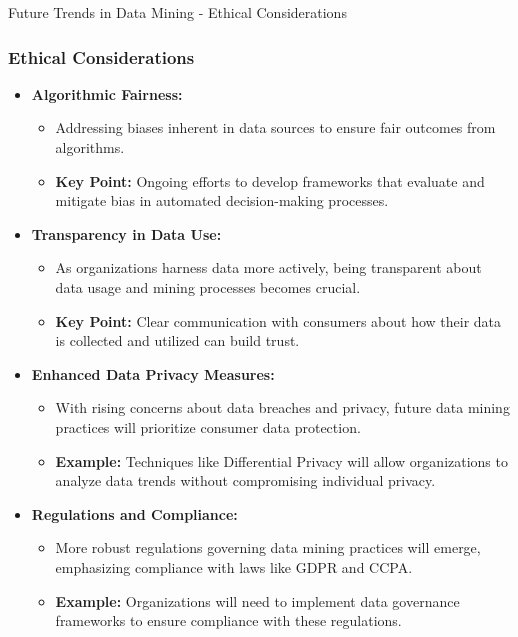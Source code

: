 \documentclass[aspectratio=169]{beamer}
\begin{document}
\begin{frame}[fragile]{Future Trends in Data Mining - Ethical Considerations}
    \frametitle{Ethical Considerations}
    \begin{itemize}
        \item \textbf{Algorithmic Fairness:}
            \begin{itemize}
                \item Addressing biases inherent in data sources to ensure fair outcomes from algorithms.
                \item \textbf{Key Point:} Ongoing efforts to develop frameworks that evaluate and mitigate bias in automated decision-making processes.
            \end{itemize}

        \item \textbf{Transparency in Data Use:}
            \begin{itemize}
                \item As organizations harness data more actively, being transparent about data usage and mining processes becomes crucial.
                \item \textbf{Key Point:} Clear communication with consumers about how their data is collected and utilized can build trust.
            \end{itemize}

        \item \textbf{Enhanced Data Privacy Measures:}
            \begin{itemize}
                \item With rising concerns about data breaches and privacy, future data mining practices will prioritize consumer data protection.
                \item \textbf{Example:} Techniques like Differential Privacy will allow organizations to analyze data trends without compromising individual privacy.
            \end{itemize}

        \item \textbf{Regulations and Compliance:}
            \begin{itemize}
                \item More robust regulations governing data mining practices will emerge, emphasizing compliance with laws like GDPR and CCPA.
                \item \textbf{Example:} Organizations will need to implement data governance frameworks to ensure compliance with these regulations.
            \end{itemize}
    \end{itemize}
\end{frame}
\end{document}
